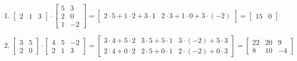 \begin{examples}\leavevmode
  \begin{enumerate}
    \item {
        $\begin{bmatrix}
          2 & 1 & 3 
        \end{bmatrix} \cdot \begin{bmatrix}
          5 & 3 \\
          2 & 0 \\
          1 & -2
        \end{bmatrix} = \begin{bmatrix}
          2 \cdot 5 + 1 \cdot 2 + 3 \cdot 1 & 2 \cdot 3 + 1 \cdot 0 + 3 \cdot (-2)
        \end{bmatrix} = \begin{bmatrix}
          15 & 0
        \end{bmatrix}$
      }

    \item {
        $\begin{bmatrix}
          3 & 5 \\ 
          2 & 0 
        \end{bmatrix} \cdot  \begin{bmatrix}
          4 & 5 & -2 \\
          2 & 1 & 3
        \end{bmatrix} = \begin{bmatrix}
          3 \cdot 4 + 5 \cdot 2 & 3 \cdot 5 + 5 \cdot 1 & 3 \cdot (-2) + 5 \cdot 3 \\
          2 \cdot 4 + 0 \cdot 2 & 2 \cdot 5 + 0 \cdot 1 & 2 \cdot (-2) + 0 \cdot 3
        \end{bmatrix} = \begin{bmatrix}
          22 & 20 & 9 \\
          8 & 10 & -4
        \end{bmatrix}$
      }
  \end{enumerate}
\end{examples}

